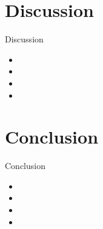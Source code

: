\section{Discussion}


\begin{frame}{Discussion}{}

\begin{itemize}
\item<1-> 
\item<1-> 
\item<1-> 
\item<1-> 

\end{itemize}

\end{frame}


\section{Conclusion}


\begin{frame}{Conclusion}{}


\begin{itemize}
\item<1->  
\item<1-> 
\item<1-> 
\item<1-> 
\end{itemize}

\end{frame}

